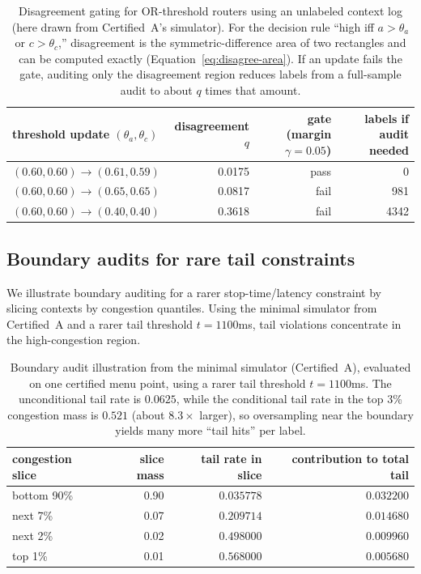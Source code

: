 \documentclass[11pt]{article}
\begin{document}
\begin{table}[t]
\centering
\begin{tabular}{@{}lrrr@{}}
\toprule
threshold update $(\theta_a,\theta_c)$ & disagreement $q$ & gate (margin $\gamma=0.05$) & labels if audit needed \\
\midrule
$(0.60,0.60)\to(0.61,0.59)$ & 0.0175 & pass & 0 \\
$(0.60,0.60)\to(0.65,0.65)$ & 0.0817 & fail & 981 \\
$(0.60,0.60)\to(0.40,0.40)$ & 0.3618 & fail & 4342 \\
\bottomrule
\end{tabular}
\caption{Disagreement gating for OR-threshold routers using an unlabeled context log (here drawn from Certified~A's simulator).
For the decision rule ``high iff $a>\theta_a$ or $c>\theta_c$,'' disagreement is the symmetric-difference area of two rectangles and can be computed exactly (Equation~\eqref{eq:disagree-area}).
If an update fails the gate, auditing only the disagreement region reduces labels from a full-sample audit to about $q$ times that amount.}
\label{tab:gate-toy}
\end{table}

\subsection{Boundary audits for rare tail constraints}
We illustrate boundary auditing for a rarer stop-time/latency constraint by slicing contexts by congestion quantiles.
Using the minimal simulator from Certified~A and a rarer tail threshold $t=1100$ms, tail violations concentrate in the high-congestion region.

\begin{table}[t]
\centering
\begin{tabular}{@{}lrrr@{}}
\toprule
congestion slice & slice mass & tail rate in slice & contribution to total tail \\
\midrule
bottom 90\% & 0.90 & $0.035778$ & $0.032200$ \\
next 7\% & 0.07 & $0.209714$ & $0.014680$ \\
next 2\% & 0.02 & $0.498000$ & $0.009960$ \\
top 1\% & 0.01 & $0.568000$ & $0.005680$ \\
\bottomrule
\end{tabular}
\caption{Boundary audit illustration from the minimal simulator (Certified~A), evaluated on one certified menu point, using a rarer tail threshold $t=1100$ms.
The unconditional tail rate is $0.0625$, while the conditional tail rate in the top 3\% congestion mass is $0.521$ (about $8.3\times$ larger), so oversampling near the boundary yields many more ``tail hits'' per label.}
\label{tab:boundary-sim}
\end{table}
\end{document}
